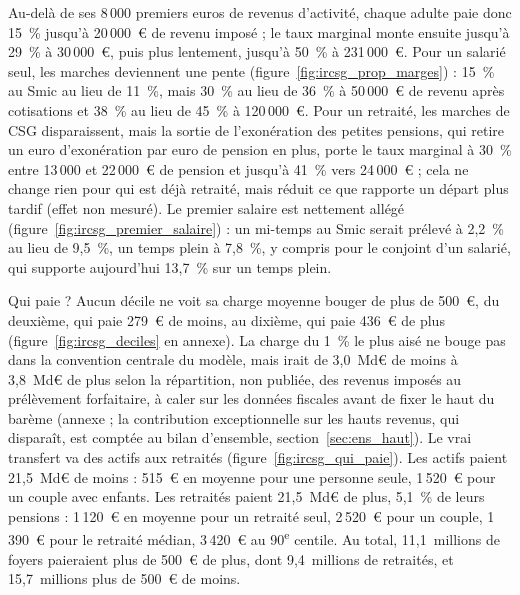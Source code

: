 
Au-delà de ses 8\,000 premiers euros de revenus d'activité, chaque adulte paie donc 15~\% jusqu'à 20\,000~€ de revenu
imposé ; le taux marginal monte ensuite jusqu'à 29~\% à 30\,000~€, puis plus lentement, jusqu'à 50~\% à 231\,000~€. Pour
un salarié seul, les marches deviennent une pente (figure~\ref{fig:ircsg_prop_marges}) : 15~\% au Smic au lieu de 11~\%,
mais 30~\% au lieu de 36~\% à 50\,000~€ de revenu après cotisations et 38~\% au lieu de 45~\% à 120\,000~€. Pour un
retraité, les marches de CSG disparaissent, mais la sortie de l'exonération des petites pensions, qui retire un euro
d'exonération par euro de pension en plus, porte le taux marginal à 30~\% entre 13\,000 et 22\,000~€ de pension et
jusqu'à 41~\% vers 24\,000~€ ; cela ne change rien pour qui est déjà retraité, mais réduit ce que rapporte un départ
plus tardif (effet non mesuré). Le premier salaire est nettement allégé (figure~\ref{fig:ircsg_premier_salaire}) : un
mi-temps au Smic serait prélevé à 2,2~\% au lieu de 9,5~\%, un temps plein à 7,8~\%, y compris pour le conjoint d'un
salarié, qui supporte aujourd'hui 13,7~\% sur un temps plein.



Qui paie ? Aucun décile ne voit sa charge moyenne bouger de plus de 500~€, du deuxième, qui paie 279~€ de moins, au
dixième, qui paie 436~€ de plus (figure~\ref{fig:ircsg_deciles} en annexe). La charge du 1~\% le plus aisé ne bouge pas
dans la convention centrale du modèle, mais irait de 3,0~Md€ de moins à 3,8~Md€ de plus selon la répartition, non
publiée, des revenus imposés au prélèvement forfaitaire, à caler sur les données fiscales avant de fixer le haut du
barème (annexe ; la contribution exceptionnelle sur les hauts revenus, qui disparaît, est comptée au bilan d'ensemble,
section~\ref{sec:ens_haut}). Le vrai transfert va des actifs aux retraités (figure~\ref{fig:ircsg_qui_paie}). Les actifs
paient 21,5~Md€ de moins : 515~€ en moyenne pour une personne seule, 1\,520~€ pour un couple avec enfants. Les retraités
paient 21,5~Md€ de plus, 5,1~\% de leurs pensions : 1\,120~€ en moyenne pour un retraité seul, 2\,520~€ pour un couple,
1\,390~€ pour le retraité médian, 3\,420~€ au 90\textsuperscript{e} centile. Au total, 11,1~millions de foyers
paieraient plus de 500~€ de plus, dont 9,4~millions de retraités, et 15,7~millions plus de 500~€ de moins.

